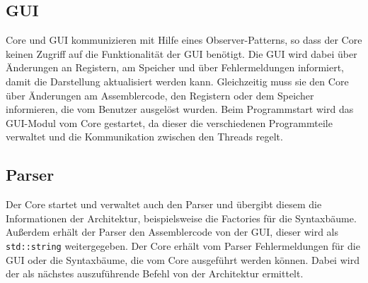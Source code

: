 \subsection{GUI}

Core und GUI kommunizieren mit Hilfe eines Observer-Patterns, so dass der Core keinen Zugriff auf die Funktionalität der GUI benötigt. Die GUI wird dabei über Änderungen an Registern, am Speicher und über Fehlermeldungen informiert, damit die Darstellung aktualisiert werden kann. Gleichzeitig muss sie den Core über Änderungen am Assemblercode, den Registern oder dem Speicher informieren, die vom Benutzer ausgelöst wurden. Beim Programmstart wird das GUI-Modul vom Core gestartet, da dieser die verschiedenen Programmteile verwaltet und die Kommunikation zwischen den Threads regelt.

\subsection{Parser}

Der Core startet und verwaltet auch den Parser und übergibt diesem die Informationen der Architektur, beispielsweise die Factories für die Syntaxbäume. Au{\ss}erdem erhält der Parser den Assemblercode von der GUI, dieser wird als \lstinline!std::string! weitergegeben. Der Core erhält vom Parser Fehlermeldungen für die GUI oder die Syntaxbäume, die vom Core ausgeführt werden können. Dabei wird der als nächstes auszuführende Befehl von der Architektur ermittelt.
